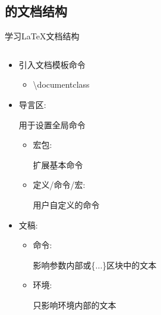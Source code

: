 \documentclass[fontset = none, xcolor=svgnames, t, aspectratio=169]{ctexbeamer}
\begin{document}
\subsection[文档结构]{\latex 的文档结构}\label{sec02-02}
\begin{frame}{学习\LaTeX}{文档结构}
  \vspace{-4ex}
  \begin{spacing}{1.1}
  \begin{columns}
    \begin{column}{0.55\textwidth}
      
      \begin{itemize}
      \item {引入文档模板命令}\\
        \begin{itemize}
        \item {\textbackslash documentclass}
        \end{itemize}
      \item {导言区:} \par
        用于设置全局命令
        \begin{itemize}
        \item {宏包:} \par
          扩展基本\latex 命令
        \item { 定义/命令/宏:}\par
          用户自定义的命令
        \end{itemize}
      \item {文稿:}
        \begin{itemize}
        \item {命令:} \par
          影响参数内部或\{...\}区块中的文本  
        \item {环境:} \par
          只影响环境内部的文本
        \end{itemize}
      \end{itemize}
      
    \end{column}


\end{columns}
\end{spacing}
\end{frame}
\end{document}

